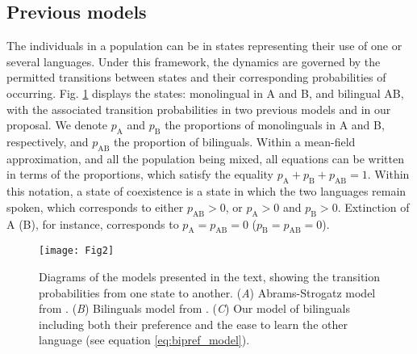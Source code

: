 \documentclass[../thesis.tex]{subfiles}
\begin{document}
\subsection{Previous models}
The individuals in a population can be in states representing their use of one or
several languages. Under this framework, the dynamics are governed by the permitted
transitions between states and their corresponding probabilities of occurring. Fig.
\ref{fig:models_diagram} displays the states: monolingual in A and B, and bilingual AB,
with the associated transition probabilities in two previous models and in our proposal.
We denote $p_{\text{A}}$ and $p_{\text{B}}$ the proportions of monolinguals in A and B,
respectively, and $p_{\text{AB}}$ the proportion of bilinguals. Within a mean-field
approximation, and all the population being mixed, all equations can be written in terms
of the proportions, which satisfy the equality $p_{\text{A}} + p_{\text{B}} +
p_{\text{AB}} = 1$. Within this notation, a state of coexistence is a state in which the
two languages remain spoken, which corresponds to either $p_{\text{AB}} > 0$, or
$p_{\text{A}} > 0$ and $p_{\text{B}} > 0$. Extinction of A (B), for instance,
corresponds to $p_{\text{A}} = p_{\text{AB}} = 0$ ($p_{\text{B}} = p_{\text{AB}} = 0$).
\begin{figure}
\centering
    \texttt{[image: Fig2]}
    \caption{Diagrams of the models presented in the text, showing the transition
    probabilities from one state to another. (\textit{A}) Abrams-Strogatz model from
    \cite{AbramsModellingDynamics2003}. (\textit{B}) Bilinguals model from
    \cite{CastelloOrderingDynamics2006}. (\textit{C}) Our model of bilinguals including
    both their preference and the ease to learn the other language (see equation
    \eqref{eq:bipref_model}).}
    \label{fig:models_diagram}
\end{figure}
\end{document}
